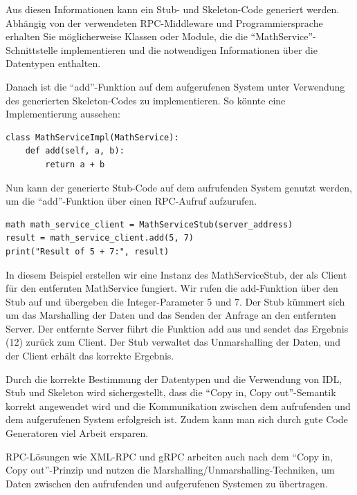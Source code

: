 Aus diesen Informationen kann ein  Stub- und Skeleton-Code generiert werden. Abhängig von der verwendeten RPC-Middleware und Programmiersprache erhalten Sie möglicherweise Klassen oder Module, die die \enquote{MathService}-Schnittstelle implementieren und die notwendigen Informationen über die Datentypen enthalten.

Danach ist die \enquote{add}-Funktion auf dem aufgerufenen System unter Verwendung des generierten Skeleton-Codes zu implementieren. So könnte eine Implementierung aussehen:\\
\noindent\begin{minipage}{\textwidth}
\begin{lstlisting}[caption={RPC IDL Service Impl},captionpos=b,label={lst:idl-impl}]
class MathServiceImpl(MathService):
    def add(self, a, b):
        return a + b
\end{lstlisting}
\end{minipage}
Nun kann der generierte Stub-Code auf dem aufrufenden System genutzt werden, um die \enquote{add}-Funktion über einen RPC-Aufruf aufzurufen.\\
\noindent\begin{minipage}{\textwidth}
\begin{lstlisting}[caption={RPC IDL Service Impl},captionpos=b,label={lst:idl-impl-service}]
math math_service_client = MathServiceStub(server_address)
result = math_service_client.add(5, 7)
print("Result of 5 + 7:", result)
\end{lstlisting}
\end{minipage}
In diesem Beispiel erstellen wir eine Instanz des MathServiceStub, der als Client für den entfernten MathService fungiert. Wir rufen die add-Funktion über den Stub auf und übergeben die Integer-Parameter 5 und 7. Der Stub kümmert sich um das Marshalling der Daten und das Senden der Anfrage an den entfernten Server. Der entfernte Server führt die Funktion add aus und sendet das Ergebnis (12) zurück zum Client. Der Stub verwaltet das Unmarshalling der Daten, und der Client erhält das korrekte Ergebnis.

Durch die korrekte Bestimmung der Datentypen und die Verwendung von IDL, Stub und Skeleton wird sichergestellt, dass die \enquote{Copy in, Copy out}-Semantik korrekt angewendet wird und die Kommunikation zwischen dem aufrufenden und dem aufgerufenen System erfolgreich ist. Zudem kann man sich durch gute Code Generatoren viel Arbeit ersparen. 

RPC-Lösungen wie XML-RPC und gRPC arbeiten auch nach dem \enquote{Copy in, Copy out}-Prinzip und nutzen die Marshalling/Unmarshalling-Techniken, um Daten zwischen den aufrufenden und aufgerufenen Systemen zu übertragen. 

